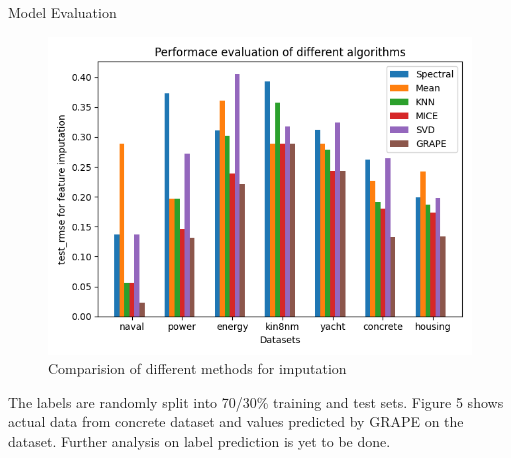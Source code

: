 \documentclass[final]{beamer}
\newlength{\colwidth}
\newlength{\twocolwidth}
\begin{document}
\begin{frame}[t]
\begin{columns}[t]
\begin{column}{\twocolwidth}
\begin{columns}[t, totalwidth=\twocolwidth]
\begin{column}{\colwidth}
\begin{block}{Model Evaluation}
   \begin{figure}
 	\includegraphics[width=1\textwidth]{figures/barplot_all.png}
 	\caption{Comparision of different methods for imputation}
 	\label{cdft}
 \end{figure}
 The labels are randomly split into 70/30\% training and test sets. Figure 5 shows actual data from concrete dataset and values predicted by GRAPE on the dataset.
Further analysis on label prediction is yet to be done.
  \end{block}


\end{column}
\end{columns}
\end{column}
\end{columns}
\end{frame}
\end{document}
